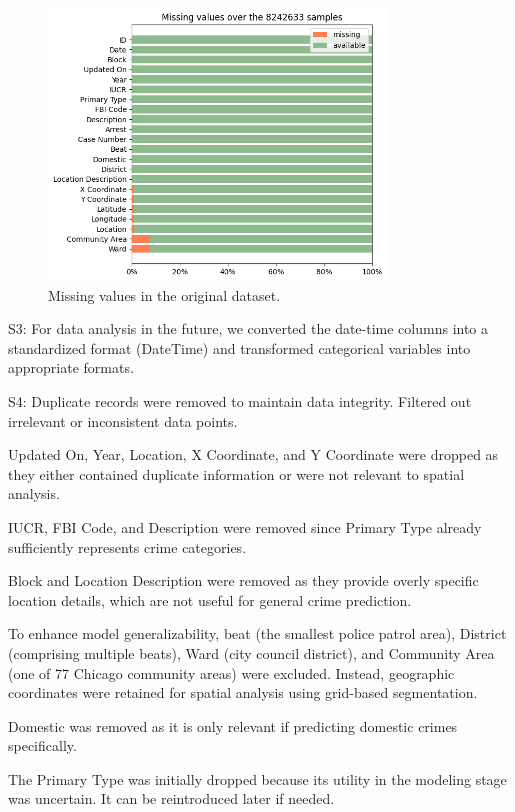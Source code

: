 \documentclass[11pt]{article}
\begin{document}
\begin{figure}[htbp]
    \centering
    \includegraphics[width=0.8\textwidth]{missing_values.png}
    \caption{Missing values in the original dataset.}
    \label{fig:missing_values}
\end{figure}

S3: For data analysis in the future, we converted the date-time columns into a standardized format (DateTime) and transformed categorical variables into appropriate formats.

S4: Duplicate records were removed to maintain data integrity. Filtered out irrelevant or inconsistent data points.

Updated On, Year, Location, X Coordinate, and Y Coordinate were dropped as they either contained duplicate information or were not relevant to spatial analysis.

IUCR, FBI Code, and Description were removed since Primary Type already sufficiently represents crime categories.

Block and Location Description were removed as they provide overly specific location details, which are not useful for general crime prediction.

To enhance model generalizability, beat (the smallest police patrol area), District (comprising multiple beats), Ward (city council district), and Community Area (one of 77 Chicago community areas) were excluded. Instead, geographic coordinates were retained for spatial analysis using grid-based segmentation.

Domestic was removed as it is only relevant if predicting domestic crimes specifically.

The Primary Type was initially dropped because its utility in the modeling stage was uncertain. It can be reintroduced later if needed.
\end{document}
